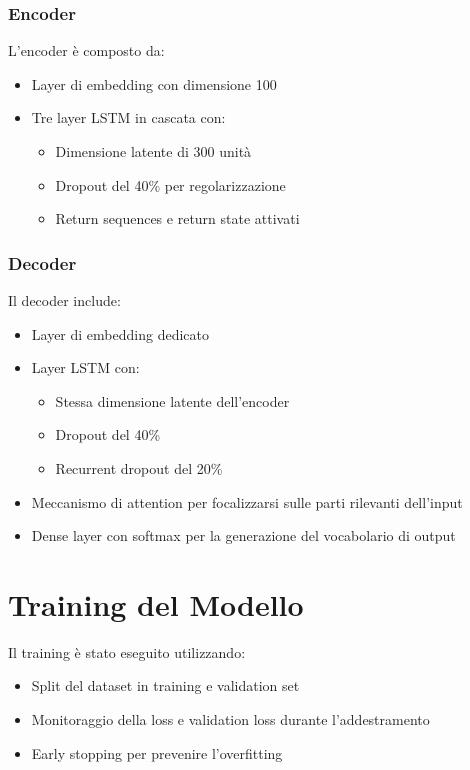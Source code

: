 \documentclass[a4paper, 12pt]{article}
\begin{document}
\subsubsection{Encoder}
L'encoder è composto da:
\begin{itemize}
    \item Layer di embedding con dimensione 100
    \item Tre layer LSTM in cascata con:
        \begin{itemize}
            \item Dimensione latente di 300 unità
            \item Dropout del 40\% per regolarizzazione
            \item Return sequences e return state attivati
        \end{itemize}
\end{itemize}

\subsubsection{Decoder}
Il decoder include:
\begin{itemize}
    \item Layer di embedding dedicato
    \item Layer LSTM con:
        \begin{itemize}
            \item Stessa dimensione latente dell'encoder
            \item Dropout del 40\%
            \item Recurrent dropout del 20\%
        \end{itemize}
    \item Meccanismo di attention per focalizzarsi sulle parti rilevanti dell'input
    \item Dense layer con softmax per la generazione del vocabolario di output
\end{itemize}

\section{Training del Modello}
Il training è stato eseguito utilizzando:
\begin{itemize}
    \item Split del dataset in training e validation set
    \item Monitoraggio della loss e validation loss durante l'addestramento
    \item Early stopping per prevenire l'overfitting
\end{itemize}
\end{document}
